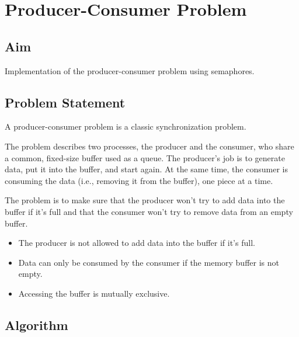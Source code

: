 \section{Producer-Consumer Problem}
\label{sec:producer_consumer}

\subsection{Aim}
Implementation of the producer-consumer problem using semaphores.

\subsection{Problem Statement}

A producer-consumer problem is a classic synchronization problem.

The problem describes two processes, the producer and the consumer, who share a common, fixed-size buffer used as a queue.
The producer's job is to generate data, put it into the buffer, and start again. At the same time, the consumer is consuming the data (i.e., removing it from the buffer), one piece at a time.

The problem is to make sure that the producer won't try to add data into the buffer if it's full and that the consumer won't try to remove data from an empty buffer.

\begin{itemize}
    \item The producer is not allowed to add data into the buffer if it's full.
    \item Data can only be consumed by the consumer if the memory buffer is not empty.
    \item Accessing the buffer is mutually exclusive.
\end{itemize}

\pagebreak
\subsection{Algorithm}

